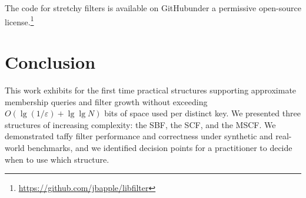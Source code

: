 \documentclass[letterpaper,twocolumn,10pt]{article}
\newcommand{\etal}{et al.}
\newcommand{\taffy}{stretchy}
\newcommand{\TBF}{SBF}
\newcommand{\TCF}{SCF}
\newcommand{\MTCF}{MSCF}
\newcommand{\taffy}{taffy}
\newcommand{\TBF}{TBF}
\newcommand{\TCF}{TCF}
\newcommand{\MTCF}{MTCF}
\begin{document}
\ifanon
\else
The code for \taffy{} filters is available \ifanon\else on GitHub\fi under a permissive open-source license.\ifanon\else\footnote{\url{https://github.com/jbapple/libfilter}}\fi
\fi








\section{Conclusion}
\label{conclusion}

This work exhibits for the first time practical structures supporting approximate membership queries and filter growth without exceeding $O(\lg (1/\varepsilon) + \lg \lg N)$ bits of space used per distinct key.
We presented three structures of increasing complexity: the \TBF{}, the \TCF{}, and the \MTCF{}.
We demonstrated taffy filter performance and correctness under synthetic and real-world benchmarks, and we identified decision points for a practitioner to decide when to use which structure.



\end{document}
